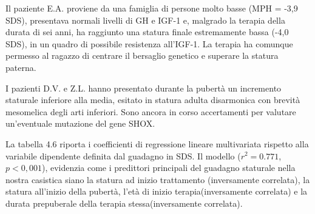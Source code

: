Il paziente E.A. proviene da una famiglia di persone molto basse (MPH = -3,9 SDS), presentava normali livelli di GH e IGF-1 e, malgrado la terapia della durata di sei anni, ha raggiunto una statura finale estremamente bassa (-4,0 SDS), in un quadro di possibile resistenza all'IGF-1. La terapia ha comunque permesso al ragazzo di centrare il bersaglio genetico e superare la statura paterna.

I pazienti D.V. e Z.L. hanno presentato durante la pubertà un incremento staturale inferiore alla media, esitato in statura adulta disarmonica con brevità mesomelica degli arti inferiori. Sono ancora in corso accertamenti per valutare un'eventuale mutazione del gene SHOX. 

  


La tabella 4.6 riporta i coefficienti di regressione lineare multivariata rispetto alla variabile dipendente definita dal guadagno in SDS.
Il modello ($r^2 = 0.771$, $p < 0,001$), evidenzia come i predittori principali del guadagno staturale nella nostra casistica siano la statura ad inizio trattamento (inversamente correlata), la statura all'inizio della pubertà, l'età di inizio terapia(inversamente correlata) e la durata prepuberale della terapia stessa(inversamente correlata).

